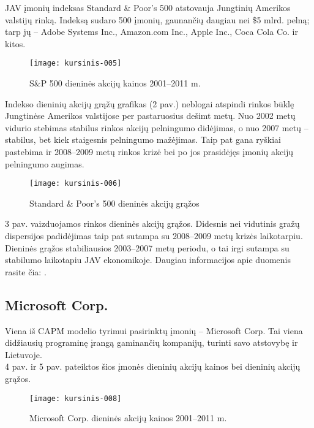 \documentclass[12pt, a14paper, lithuanian]{article}
\begin{document}
JAV įmonių indeksas Standard \& Poor's 500 atstovauja Jungtinių Amerikos valstijų
rinką. Indeksą sudaro 500 įmonių, gaunančių daugiau nei \$5 mlrd. pelną; tarp jų -- Adobe Systems Inc.,
Amazon.com Inc., Apple Inc., Coca Cola Co. ir kitos. \\


\begin{figure}[H]
  \centering
\texttt{[image: kursinis-005]}
  \caption{S\&P 500 dieninės akcijų kainos 2001--2011 m.}
  \label{fig:2}
\end{figure}

Indekso dieninių akcijų grąžų grafikas (2 pav.) neblogai atspindi rinkos būklę Jungtinėse Amerikos valstijose per pastaruosius dešimt metų. Nuo 2002 metų vidurio stebimas stabilus rinkos akcijų pelningumo didėjimas, o nuo 2007 metų -- stabilus, bet kiek staigesnis pelningumo mažėjimas.
Taip pat gana ryškiai pastebima ir 2008--2009 metų rinkos krizė bei po jos prasidėjęs įmonių akcijų pelningumo augimas.

\begin{figure}[H]
  \centering
\texttt{[image: kursinis-006]}
  \caption{Standard \& Poor's 500 dieninės akcijų grąžos}
  \label{fig:3}
\end{figure}

3 pav. vaizduojamos rinkos dieninės akcijų grąžos. Didesnis nei vidutinis gražų dispersijos padidėjimas
taip pat sutampa su 2008--2009 metų krizės laikotarpiu. Dieninės grąžos stabiliausios 2003--2007 metų periodu,
o tai irgi sutampa su stabilumo laikotapiu JAV ekonomikoje. Daugiau informacijos apie duomenis rasite čia: \cite{market}.    \\


\subsection{Microsoft Corp.}

Viena iš CAPM modelio tyrimui pasirinktų įmonių -- Microsoft Corp. Tai viena didžiausių programinę įrangą
 gaminančių kompanijų, turinti savo atstovybę ir Lietuvoje. \\
 
 4 pav. ir 5 pav. pateiktos šios įmonės dieninių akcijų kainos
 bei dieninių akcijų grąžos.
 
\begin{figure}[H]
  \centering
\texttt{[image: kursinis-008]}
  \caption{Microsoft Corp. dieninės akcijų kainos 2001--2011 m.}
  \label{fig:4}
\end{figure}
\end{document}
